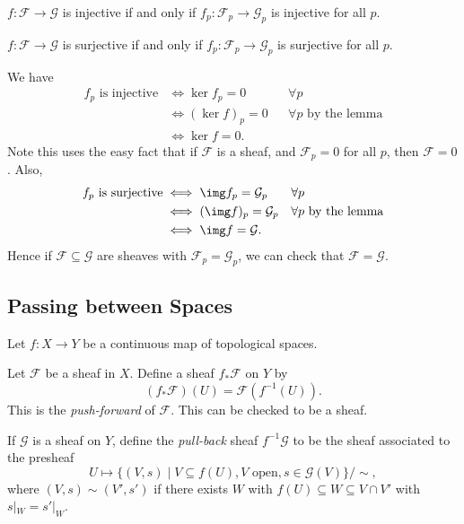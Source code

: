 \documentclass[12pt]{article}
\begin{document}
\begin{proposition}
	$f : \mathcal{F} \to \mathcal{G}$ is injective if and only if $f_p : \mathcal{F}_p \to \mathcal{G}_p$ is injective for all $p$.

	$f : \mathcal{F} \to \mathcal{G}$ is surjective if and only if $f_p : \mathcal{F}_p \to \mathcal{G}_p$ is surjective for all $p$.
\end{proposition}

\begin{proofbox}
	We have
	\begin{align*}
		f_p \text{ is injective} &\iff \ker f_p = 0 & &\forall p\\
					 &\iff (\ker f)_p = 0 & &\forall p \text{ by the lemma} \\
					 &\iff \ker f = 0.
	\end{align*}
	Note this uses the easy fact that if $\mathcal{F}$ is a sheaf, and $\mathcal{F}_p = 0$ for all $p$, then $\mathcal{F} = 0$. Also,
	\begin{align*}
		f_p \text{ is surjective} &\iff \img f_p = \mathcal{G}_p & &\forall p \\
					  &\iff (\img f)_p = \mathcal{G}_p & & \forall p \text{ by the lemma} \\
					  &\iff \img f = \mathcal{G}.
	\end{align*}
	Hence if $\mathcal{F} \subseteq \mathcal{G}$ are sheaves with $\mathcal{F}_p = \mathcal{G}_p$, we can check that $\mathcal{F} = \mathcal{G}$.
\end{proofbox}

\subsection{Passing between Spaces}%
\label{sub:pbs}

Let $f : X \to Y$ be a continuous map of topological spaces.

Let $\mathcal{F}$ be a sheaf in $X$. Define a sheaf $f_\ast \mathcal{F}$ on $Y$ by
\[
	(f_\ast \mathcal{F})(U) = \mathcal{F}(f^{-1}(U)).
\]
This is the \emph{push-forward} of $\mathcal{F}$. This can be checked to be a sheaf.

If $\mathcal{G}$ is a sheaf on $Y$, define the \emph{pull-back} sheaf $f^{-1} \mathcal{G}$ to be the sheaf associated to the presheaf
\[
	U \mapsto \{(V, s) \mid V \subseteq f(U), V \text{ open}, s \in \mathcal{G}(V)\} / \sim,
\]
where $(V, s) \sim (V', s')$ if there exists $W$ with $f(U) \subseteq W \subseteq V \cap V'$ with $s|_W = s'|_W$.
\end{document}

